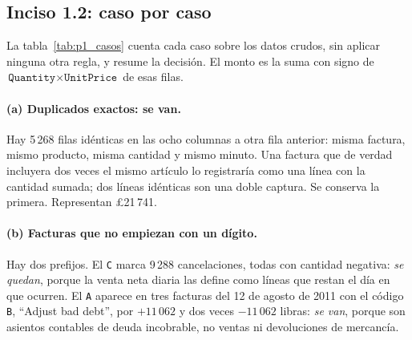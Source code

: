 \subsection{Inciso 1.2: caso por caso}

La tabla~\ref{tab:p1_casos} cuenta cada caso sobre los datos crudos, sin
aplicar ninguna otra regla, y resume la decisión. El monto es la suma con
signo de $\texttt{Quantity}\times\texttt{UnitPrice}$ de esas filas.

\begin{table}[H]
  \centering
  \small
  \caption{Casos del inciso 1.2 sobre los datos crudos. Un caso puede
  traslapar con otro; el efecto conjunto está en la bitácora
  (tabla~\ref{tab:p1_bitacora}).}
  \label{tab:p1_casos}
\end{table}

\paragraph{(a) Duplicados exactos: se van.} Hay 5\,268 filas idénticas en las
ocho columnas a otra fila anterior: misma factura, mismo producto, misma
cantidad y mismo minuto. Una factura que de verdad incluyera dos veces el
mismo artículo lo registraría como una línea con la cantidad sumada; dos
líneas idénticas son una doble captura. Se conserva la primera. Representan
\pounds21\,741.

\paragraph{(b) Facturas que no empiezan con un dígito.} Hay dos prefijos. El
\texttt{C} marca 9\,288 cancelaciones, todas con cantidad negativa: \emph{se
quedan}, porque la venta neta diaria las define como líneas que restan el día
en que ocurren. El \texttt{A} aparece en tres facturas del 12 de agosto de 2011
con el código \texttt{B}, ``Adjust bad debt'', por $+11\,062$ y dos veces
$-11\,062$ libras: \emph{se van}, porque son asientos contables de deuda
incobrable, no ventas ni devoluciones de mercancía.


